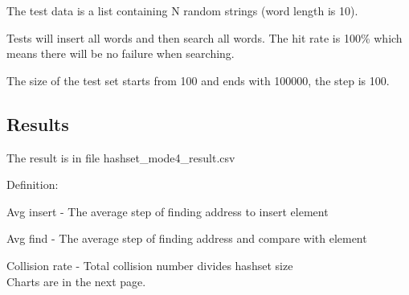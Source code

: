 \documentclass[a4]{article}
\begin{document}
\noindent The test data is a list containing N random strings (word length is 10).

\noindent Tests will insert all words and then search all words. The hit rate is 100\% which means there will be no failure when searching.

\noindent The size of the test set starts from 100 and ends with 100000, the step is 100.



\subsection{Results}

The result is in file hashset\_mode4\_result.csv

Definition:

Avg insert - The average step of finding address to insert element

Avg find - The average step of finding address and compare with element

Collision rate - Total collision number divides hashset size
\\
\noindent Charts are in the next page.
\end{document}
